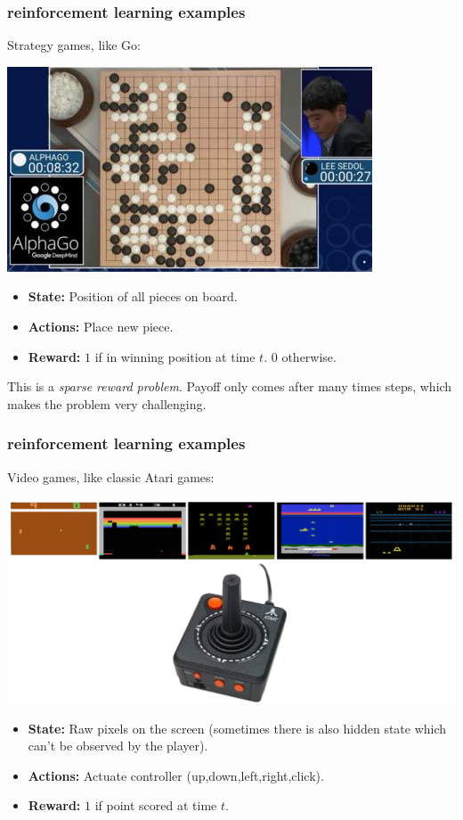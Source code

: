 \documentclass[handout,compress]{beamer}
\begin{document}
\begin{frame}
	\frametitle{reinforcement learning examples}
	\small
	Strategy games, like Go:
	\begin{center}
		\includegraphics*[width=.5\textwidth]{alpah_go.jpg}
	\end{center}
	\begin{multicols}{2}
		\begin{itemize}
			\item \textbf{State:} Position of all pieces on board.
			\item \textbf{Actions:} Place new piece.
			\item \textbf{Reward:} $1$ if in winning position at time $t$. $0$ otherwise.
		\end{itemize}
	\end{multicols}
This is a \emph{sparse reward problem}. Payoff only comes after many times steps, which makes the problem very challenging.
\end{frame}

\begin{frame}
	\frametitle{reinforcement learning examples}
	\small
	Video games, like classic Atari games:
	\begin{center}
		\includegraphics*[width=.8\textwidth]{atari_full.png}
	\end{center}
	\begin{multicols}{2}
		\begin{itemize}
			\item \textbf{State:} Raw pixels on the screen (sometimes there is also hidden state which can't be observed by the player). 
			\item \textbf{Actions:} Actuate controller (up,down,left,right,click).
			\item \textbf{Reward:} $1$ if point scored at time $t$. 
		\end{itemize}
	\end{multicols}
	
\end{frame}
\end{document}
